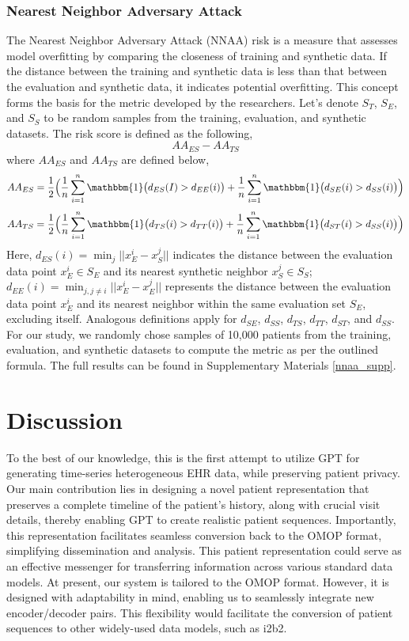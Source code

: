 \begin{multicols}{2}
\subsubsection{Nearest Neighbor Adversary Attack}
The Nearest Neighbor Adversary Attack (NNAA) risk is a measure that assesses model overfitting by comparing the closeness of training and synthetic data. If the distance between the training and synthetic data is less than that between the evaluation and synthetic data, it indicates potential overfitting. This concept forms the basis for the metric developed by the researchers. Let's denote $S_T$, $S_E$, and $S_S$ to be random samples from the training, evaluation, and synthetic datasets. The risk score is defined as the following,
\[
    AA_{ES} - AA_{TS}
\]
where $AA_{ES}$ and $AA_{TS}$ are defined below,
\small 
\[
    AA_{ES} = \frac{1}{2} \Big( \frac{1}{n} \sum_{i=1}^n \mathbbm{1} \big(d_{ES}(I) > d_{EE}(i) \big) + \frac{1}{n} \sum_{i=1}^n \mathbbm{1} \big(d_{SE}(i) > d_{SS}(i) \big) \Big)
\]
\[
    AA_{TS} = \frac{1}{2} \Big( \frac{1}{n} \sum_{i=1}^n \mathbbm{1} \big(d_{TS}(i) > d_{TT}(i) \big) + \frac{1}{n} \sum_{i=1}^n \mathbbm{1}\big(d_{ST}(i) > d_{SS}(i) \big) \Big)
\]
\normalsize
Here, $d_{ES}(i)=\min_j||x_E^i - x_S^j||$ indicates the distance between the evaluation data point $x_E^i \in S_E$ and its nearest synthetic neighbor $x_S^j \in S_S$; $d_{EE}(i)=\min_{j, j \neq i}||x_E^i - x_E^j||$ represents the distance between the evaluation data point $x_E^i$ and its nearest neighbor within the same evaluation set $S_E$, excluding itself. Analogous definitions apply for $d_{SE}$, $d_{SS}$, $d_{TS}$, $d_{TT}$, $d_{ST}$, and $d_{SS}$. For our study, we randomly chose samples of 10,000 patients from the training, evaluation, and synthetic datasets to compute the metric as per the outlined formula. The full results can be found in Supplementary Materials \ref{nnaa_supp}.

\section{Discussion}
To the best of our knowledge, this is the first attempt to utilize GPT for generating time-series heterogeneous EHR data, while preserving patient privacy. Our main contribution lies in designing a novel patient representation that preserves a complete timeline of the patient's history, along with crucial visit details, thereby enabling GPT to create realistic patient sequences. Importantly, this representation facilitates seamless conversion back to the OMOP format, simplifying dissemination and analysis. This patient representation could serve as an effective messenger for transferring information across various standard data models. At present, our system is tailored to the OMOP format. However, it is designed with adaptability in mind, enabling us to seamlessly integrate new encoder/decoder pairs. This flexibility would facilitate the conversion of patient sequences to other widely-used data models, such as i2b2\cite{murphy2010serving}.


\end{multicols}
